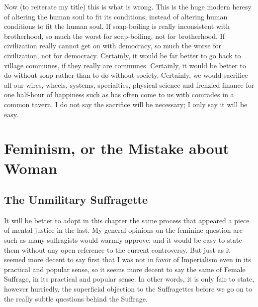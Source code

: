 \documentclass{book}
\begin{document}
Now (to reiterate my title) this is what is wrong. This is the huge modern heresy of altering the human soul to fit its conditions, instead of altering human conditions to fit the human soul. If soap-boiling is really inconsistent with brotherhood, so much the worst for soap-boiling, not for brotherhood. If civilization really cannot get on with democracy, so much the worse for civilization, not for democracy. Certainly, it would be far better to go back to village communes, if they really are communes. Certainly, it would be better to do without soap rather than to do without society. Certainly, we would sacrifice all our wires, wheels, systems, specialties, physical science and frenzied finance for one half-hour of happiness such as has often come to us with comrades in a common tavern. I do not say the sacrifice will be necessary; I only say it will be easy.

\setcounter{chapter}{0}\part{Feminism, or the Mistake about Woman}
\label{chapter-18}
\chapter{The Unmilitary Suffragette}
\label{chapter-19}
It will be better to adopt in this chapter the same process that appeared a piece of mental justice in the last. My general opinions on the feminine question are such as many suffragists would warmly approve; and it would be easy to state them without any open reference to the current controversy. But just as it seemed more decent to say first that I was not in favor of Imperialism even in its practical and popular sense, so it seems more decent to say the same of Female Suffrage, in its practical and popular sense. In other words, it is only fair to state, however hurriedly, the superficial objection to the Suffragettes before we go on to the really subtle questions behind the Suffrage.
\end{document}
